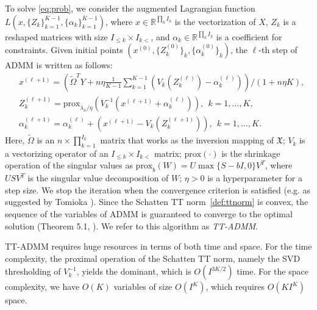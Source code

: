 To solve \eqref{eq:prob}, we consider the
augmented Lagrangian function
$L(x, \{Z_k\}_{k=1}^{K-1}, \{\alpha_k\}_{k=1}^{K-1})$,
where $x \in \mathbb{R}^{\prod_k I_k}$ is the
vectorization of $X$, $Z_k$ is a reshaped matrices with size
$I_{\leq k} \times I_{k<}$, and
$\alpha_k \in \mathbb{R}^{\prod_k I_k}$ is a coefficient for
constraints.  Given initial points
$(x^{(0)}, \{Z_k^{(0)}\}_k, \{\alpha_k^{(0)}\}_k)$, the $\ell$-th step
of ADMM is written as follows:
\begin{align*}
	&x^{(\ell + 1)} = \left( \tilde{\Omega}^T Y+ n \eta \frac{1}{K-1}\sum_{k=1}^{K-1} (V_k(Z_k^{(\ell)}) - \alpha_k^{(\ell)})\right) / (1 + n \eta K),\\
	&Z_k^{(\ell + 1)} = \mbox{prox}_{\lambda_n / \eta} (V_k^{-1}(x^{(\ell + 1)} + \alpha_k^{(\ell)})), ~~ k = 1,\ldots,K,\\
	& \alpha_k^{(\ell + 1)} = \alpha_k^{(\ell)} + (x^{(\ell + 1)} - V_k(Z_k^{(\ell + 1)})), ~~  k = 1,\ldots,K.
\end{align*}
Here, $\tilde{\Omega}$ is an $n \times \prod_{k=1}^{I_k}$ matrix that
works as the inversion mapping of $\mathfrak{X}$; 
$V_k$ is a vectorizing operator of an $I_{\leq k} \times I_{k<}$
matrix; $\mbox{prox}(\cdot)$ is the shrinkage operation of the
singular values as $\mbox{prox}_{b}(W) = U \max\{S-bI,0\}V^T$, where
$USV^T$ is the singular value decomposition of $W$; $\eta>0$ is a
hyperparameter for a step size.  We stop the iteration when the
convergence criterion is satisfied (e.g. as suggested by
Tomioka \etal \cite{tomioka2011statistical}). Since the Schatten TT
norm~\eqref{def:ttnorm} is convex, the sequence of the variables of
ADMM is guaranteed to converge to the optimal solution (Theorem
5.1, \cite{gandy2011tensor}). We refer to this algorithm as \emph{TT-ADMM}.

TT-ADMM requires huge resources in terms of both time and space.  For
the time complexity, the proximal operation of the Schatten TT norm,
namely the SVD thresholding of $V_k^{-1}$, yields the dominant, which is
$O(I^{3K/2})$ time. For the space complexity, we have $O(K)$ variables
of size $O(I^K)$, which requires $O(KI^K)$ space.




